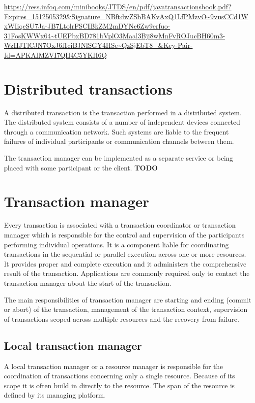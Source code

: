 \documentclass[oneside,
  digital, %
  table,   %
  nolof,     %
  nolot,     %
]{fithesis3}
\begin{document}
\url{https://ress.infoq.com/minibooks/JTDS/en/pdf/javatransactionsbook.pdf?Expires=1512505329&Signature=NBftdwZSbBAKvAxQ1LfPMzvO~9vusCCd1WxWIiqcSU7Ja-JB7LtolrFSCIBkZM2mDYNc6Zw9erfuo-31FosKWWx64~tUEPbxBD781bVplO3Maal3Bji8wMnFvROJucBH60m3-WzHJTlCJN7OxJ6l1ciBJNlSGY4HSc~QzSjEbT8_&Key-Pair-Id=APKAIMZVI7QH4C5YKH6Q}


\section{Distributed transactions}

A distributed transaction is the transaction performed in a distributed system.  
The distributed system consists of a number of independent devices connected through a communication network. Such systems are liable to the frequent failures of individual participants or communication channels between them. 

The transaction manager can be implemented as a separate service or being placed with some participant or the client. \textbf{TODO}

\section{Transaction manager}

Every transaction is associated with a transaction coordinator or transaction manager which is responsible for the control and supervision of the participants performing individual operations. It is a component liable for coordinating transactions in the sequential or parallel execution across one or more resources. It provides proper and complete execution and it administers the comprehensive result of the transaction.  Applications are commonly required only to contact the transaction manager about the start of the transaction.

The main responsibilities of transaction manager are starting and ending (commit or abort) of the transaction, management of the transaction context, supervision of transactions scoped across multiple resources and the recovery from failure.

\subsection{Local transaction manager}

A local transaction manager or a resource manager is responsible for the coordination of transactions concerning only a single resource. Because of its scope it is often build in directly to the resource. The span of the resource is defined by its managing platform. 
\end{document}
